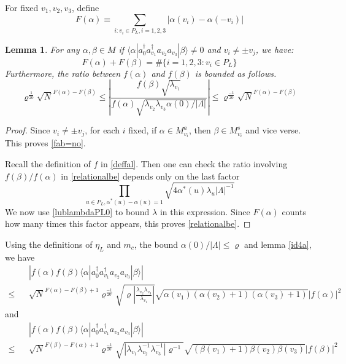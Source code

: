 \documentclass[11pt]{article}
\numberwithin{equation}{section}
\newcommand{\beq}{\begin{equation}}
\newcommand{\eeq}{\end{equation}}
\newcommand{\beqa}{\begin{eqnarray}}
\newcommand{\eeqa}{\end{eqnarray}}
\newcommand\al{{\alpha}}
\newcommand\be{\beta}
\renewcommand\rho\varrho
\newtheorem{lem}{Lemma}[section]
\theoremstyle{definition}
\begin{document}
 
For fixed $v_1,v_2,v_3$, define 
\beq\label{defFal}
F(\al)\equiv \sum_{i: v_i\in P_L, i = 1, 2, 3} |\al(v_i)-\al(-v_i)|
\eeq
\begin{lem}\label{FalFbe0}
For any $\al, \be\in M$  if  $ \langle \al| a^\dagger_{0}a^\dagger_{v_1}a_{v_2}a_{v_3}|\be\rangle\neq 0$ and $v_i\neq \pm v_j$, we have:
 \beq\label{fab=no}
 F(\al)+F(\be)= \# \{i =1, 2, 3:  v_i\in P_L \}
 \eeq  
Furthermore,  the ratio between  $f(\al)$ and $f(\be)$ is bounded as follows. 
 \beq\label{relationalbe}
 \rho^{\frac{1}{20}}\sqrt{N}^{F(\al)-F(\be)}\leq \left|\frac{f(\be)\sqrt{\lambda_{v_1}}}{f(\al)\sqrt{\lambda_{v_2}\lambda_{v_3}\al(0)/|\Lambda|}}\right|\leq \rho^{\frac{-1}{20}}\sqrt{N}^{F(\al)-F(\be)}
 \eeq
\end{lem}
 \begin{proof} Since  $v_i\neq \pm v_j$,  for each $i$ fixed,  if $\alpha \in M^a_{v_i}$, 
 then $\beta \in  M^s_{v_i}$ and vice verse.    This proves  \eqref{fab=no}.
 
 
 Recall  the definition of $f$ in \eqref{deffal}. Then one can check the ratio involving $f(\be)/f(\al)$ in \eqref{relationalbe}  depends only on the last factor 
 \[
 \prod_{u\in P_L, \alpha^\ast (u) - \alpha (u) = 1}\sqrt{4\al^*(u)\lambda_u|\Lambda|^{-1}}
\]
We now use \eqref{lublambdaPL0} 
to bound $\lambda$ in this expression. Since $F(\alpha)$ counts how many times this factor appears, 
this proves \eqref{relationalbe}. 
 \end{proof}
 
 
Using the definitions of $\eta_L$ and $m_c$, the bound $\alpha(0)/|\Lambda| \le \rho$ 
and lemma \ref{id4a}, we have   
 \beqa\label{fal0}
 &&\left|f(\al)f(\be)\langle \al| a^\dagger_{0}a^\dagger_{v_1}a_{v_2}a_{v_3}|\be\rangle\right|\\\nonumber
 \leq&& \sqrt{N}^{F(\al)-F(\be)+1}\rho^{\frac{-1}{20}} \sqrt{ \rho \left|\frac{\lambda_{v_2}\lambda_{v_3}}{\lambda_{v_1}}\right|}\sqrt{\al(v_1)(\al(v_2)+1)(\al(v_3)+1)}|f(\al)|^2
 \eeqa
 and
 \beqa
 &&\label{fbe0}
 \left|f(\al)f(\be)\langle \al| a^\dagger_{0}a^\dagger_{v_1}a_{v_2}a_{v_3}|\be\rangle\right|\\\nonumber
 \leq&&\sqrt{N}^{F(\be)-F(\al)+1}\rho^{\frac{-1}{20}} \sqrt{\left|\lambda_{v_1}\lambda_{v_2}^{-1}\lambda_{v_3}^{-1}\right|\rho^{-1}}\sqrt{(\be(v_1)+1)\be(v_2)\be(v_3)}|f(\be)|^2
 \eeqa
 
\end{document}
